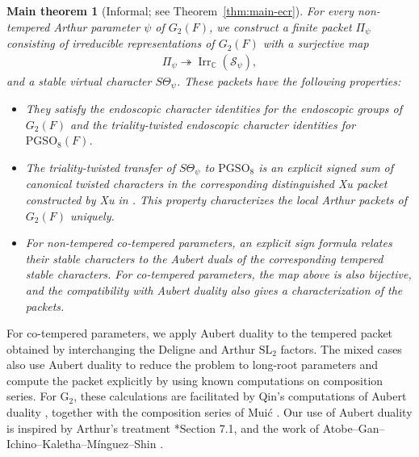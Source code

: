 \documentclass[12pt]{amsart}
\theoremstyle{definition}
\theoremstyle{plain}
\newtheorem*{maintheorem}{Main theorem}
\theoremstyle{remark}
\def\C{\mathbb{C}}%
\def\SL{\mathrm{SL}}
\def\PGSO{\mathrm{PGSO}}
\DeclareMathOperator{\Irr}{Irr}%
\newcommand{\cS}{\mathcal{S}}
\numberwithin{equation}{section}
\newcommand{\rG}{\mathrm{G}}
\begin{document}
\begin{maintheorem}[Informal; see Theorem~\ref{thm:main-ecr}]\label{thm:main-intro}
For every non-tempered Arthur parameter $\psi$ of $G_2(F)$, we construct a finite
packet $\Pi_\psi$ consisting of irreducible representations of $G_2(F)$ with a surjective map
\begin{align*}
      \Pi_{\psi} \twoheadrightarrow \Irr_{\C}(\cS_{\psi}),
\end{align*}
and a stable virtual character $S\Theta_\psi$. These packets have the following properties:
\begin{itemize}
      
\item They satisfy the endoscopic character identities for the endoscopic groups of $G_2(F)$ and the triality-twisted endoscopic character identities for $\PGSO_8(F)$.

\item The triality-twisted transfer of $S\Theta_\psi$ to $\PGSO_8$
is an explicit signed sum of canonical twisted characters in the
corresponding distinguished Xu packet constructed by Xu in \cite{Xu2024-ArthurPacketsQuasisplitGSp2nGO2n}.
This property characterizes the local Arthur packets of $G_2(F)$ uniquely.

\item For non-tempered co-tempered parameters, an explicit sign
formula relates their stable characters to the Aubert duals of the corresponding tempered stable characters.
For co-tempered parameters, the map above is also bijective, and the compatibility with Aubert duality also gives a characterization of the packets.

\end{itemize}
\end{maintheorem}



For co-tempered parameters, we apply Aubert duality to the tempered packet obtained by interchanging the Deligne and Arthur $\SL_2$ factors.
The mixed cases also use Aubert duality to reduce the problem to long-root parameters and compute the packet explicitly by using known computations on composition series. 
For $\rG_2$, these calculations are facilitated by Qin's computations of Aubert duality
\cite{Qin2026-AubertZelevinskyInvolutionG2HeckeAlgebras}, together with the composition series of Mui\'c \cite{Muic1997-UnitaryDualG2}.
Our use of Aubert duality is inspired by Arthur's treatment
\cite{Arthur2013-EndoscopicClassificationRepresentations}*{Section 7.1}, \cite{Hiraga2004-FunctorialityZelevinskiInvolutions}
and the work of Atobe--Gan--Ichino--Kaletha--M\'inguez--Shin
\cite{AtobeGanEtAl2025-LocalIntertwiningRelationsCoTemperedPackets}.
\end{document}
